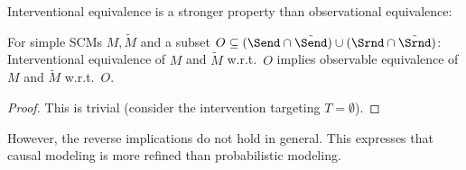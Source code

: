 Interventional equivalence is a stronger property than observational equivalence:
\begin{Prp}\label{prp:pearls_ladder_levels_1_and_2}
  For simple SCMs $M, \tilde{M}$ and a subset $O \subseteq (\Send \cap \tilde{\Send}) \cup (\Srnd \cap \tilde{\Srnd})$:
  Interventional equivalence of $M$ and $\tilde{M}$ w.r.t.\ $O$ implies observable equivalence of $M$ and $\tilde{M}$ w.r.t.\ $O$.
\end{Prp}
\begin{proof}
%
  This is trivial (consider the intervention targeting $T = \emptyset$).
\end{proof}
However, the reverse implications do not hold in general. This expresses that causal modeling is more refined than probabilistic modeling.
